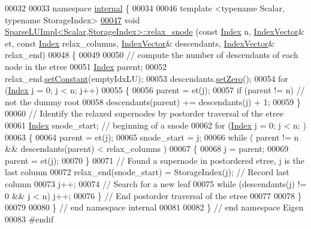 \begin{DoxyCode}
00032 
00033 \textcolor{keyword}{namespace }\hyperlink{namespaceinternal}{internal} \{
00034  
00046 \textcolor{keyword}{template} <\textcolor{keyword}{typename} Scalar, \textcolor{keyword}{typename} StorageIndex>
\hyperlink{group___sparse_l_u___module_a33672df380f94e774c5a6919d3474af4}{00047} \textcolor{keywordtype}{void} \hyperlink{group___sparse_l_u___module_a33672df380f94e774c5a6919d3474af4}{SparseLUImpl<Scalar,StorageIndex>::relax\_snode} (\textcolor{keyword}{const} 
      \hyperlink{namespace_eigen_a62e77e0933482dafde8fe197d9a2cfde}{Index} n, \hyperlink{group___core___module_class_eigen_1_1_matrix}{IndexVector}& et, \textcolor{keyword}{const} \hyperlink{namespace_eigen_a62e77e0933482dafde8fe197d9a2cfde}{Index} relax\_columns, 
      \hyperlink{group___core___module_class_eigen_1_1_matrix}{IndexVector}& descendants, \hyperlink{group___core___module_class_eigen_1_1_matrix}{IndexVector}& relax\_end)
00048 \{
00049   
00050   \textcolor{comment}{// compute the number of descendants of each node in the etree}
00051   \hyperlink{namespace_eigen_a62e77e0933482dafde8fe197d9a2cfde}{Index} parent; 
00052   relax\_end.\hyperlink{class_eigen_1_1_plain_object_base_ac8dea1df3d92b752cc683ff42abf6f9b}{setConstant}(emptyIdxLU);
00053   descendants.\hyperlink{class_eigen_1_1_plain_object_base_ac21ad5f989f320e46958b75ac8d9a1da}{setZero}();
00054   \textcolor{keywordflow}{for} (\hyperlink{namespace_eigen_a62e77e0933482dafde8fe197d9a2cfde}{Index} j = 0; j < n; j++) 
00055   \{
00056     parent = et(j);
00057     \textcolor{keywordflow}{if} (parent != n) \textcolor{comment}{// not the dummy root}
00058       descendants(parent) += descendants(j) + 1;
00059   \}
00060   \textcolor{comment}{// Identify the relaxed supernodes by postorder traversal of the etree}
00061   \hyperlink{namespace_eigen_a62e77e0933482dafde8fe197d9a2cfde}{Index} snode\_start; \textcolor{comment}{// beginning of a snode }
00062   \textcolor{keywordflow}{for} (\hyperlink{namespace_eigen_a62e77e0933482dafde8fe197d9a2cfde}{Index} j = 0; j < n; )
00063   \{
00064     parent = et(j);
00065     snode\_start = j; 
00066     \textcolor{keywordflow}{while} ( parent != n && descendants(parent) < relax\_columns ) 
00067     \{
00068       j = parent; 
00069       parent = et(j);
00070     \}
00071     \textcolor{comment}{// Found a supernode in postordered etree, j is the last column }
00072     relax\_end(snode\_start) = StorageIndex(j); \textcolor{comment}{// Record last column}
00073     j++;
00074     \textcolor{comment}{// Search for a new leaf}
00075     \textcolor{keywordflow}{while} (descendants(j) != 0 && j < n) j++;
00076   \} \textcolor{comment}{// End postorder traversal of the etree}
00077   
00078 \}
00079 
00080 \} \textcolor{comment}{// end namespace internal}
00081 
00082 \} \textcolor{comment}{// end namespace Eigen}
00083 \textcolor{preprocessor}{#endif}
\end{DoxyCode}
